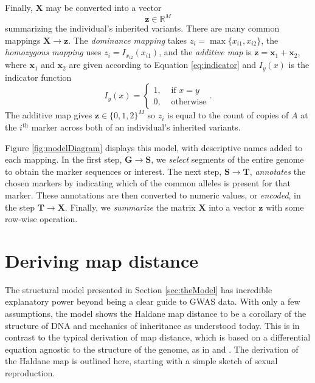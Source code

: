 \documentclass{article}
\newcommand{\ve}[1]{\mathbf{#1}}           %
\newcommand{\m}[1]{\mathbf{#1}}               %
\newcommand{\ind}[2]{I_{#2} \left( #1 \right)}
\newcommand{\field}[1]{\mathbb{#1}}
\newcommand{\Reals}{\field{R}}
\begin{document}
Finally, $\m{X}$ may be converted into a vector
$$\ve{z} \in \Reals^M$$
summarizing the individual's inherited variants. There are many common mappings $\m{X} \rightarrow \ve{z}$. The \textit{dominance mapping} takes $z_i = \max\{x_{i1}, x_{i2}\}$, the \textit{homozygous mapping} uses $z_i = \ind{x_{i1}}{x_{i2}}$, and the \textit{additive map} is $\ve{z} = \ve{x}_1 + \ve{x}_2$, where $\ve{x}_1$ and $\ve{x}_2$ are given according to Equation \ref{eq:indicator} and $\ind{x}{y}$ is the indicator function
\begin{equation*}\ind{x}{y} = \begin{cases}
  1, & \text{ if } x = y \\
  0, & \text{ otherwise}
\end{cases}.\end{equation*} The additive map gives $\ve{z} \in \{0,1,2\}^M$ so $z_i$ is equal to the count of copies of $A$ at the $i^{\text{th}}$ marker across both of an individual's inherited variants.

Figure \ref{fig:modelDiagram} displays this model, with descriptive names added to each mapping. In the first step, $\m{G} \rightarrow \m{S}$, we \textit{select} segments of the entire genome to obtain the marker sequences or interest. The next step, $\m{S} \rightarrow \m{T}$, \textit{annotates} the chosen markers by indicating which of the common alleles is present for that marker. These annotations are then converted to numeric values, or \textit{encoded}, in the step $\m{T} \rightarrow \m{X}$. Finally, we \textit{summarize} the matrix $\m{X}$ into a vector $\ve{z}$ with some row-wise operation.

\section{Deriving map distance} \label{sec:derivingDists}

The structural model presented in Section \ref{sec:theModel} has incredible explanatory power beyond being a clear guide to GWAS data. With only a few assumptions, the model shows the Haldane map distance to be a corollary of the structure of DNA and mechanics of inheritance as understood today. This is in contrast to the typical derivation of map distance, which is based on a differential equation agnostic to the structure of the genome, as in \cite{kosambi1943estimation} and \cite{xu2013principles}. The derivation of the Haldane map is outlined here, starting with a simple sketch of sexual reproduction.
\end{document}
